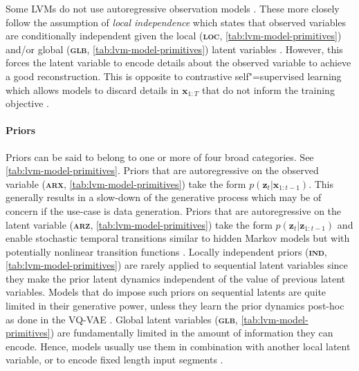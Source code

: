 {Some LVMs do not use autoregressive observation models \parencite{ebbers_hidden_2017, glarner_full_2018, hsu_unsupervised_2017, hsu_learning_2017, khurana_factorial_2019, khurana_convolutional_2020}. These more closely follow the assumption of \emph{local independence} which states that observed variables are conditionally independent given the local (\textbf{\textsc{loc}}, \cref{tab:lvm-model-primitives}) and/or global (\textbf{\textsc{glb}}, \cref{tab:lvm-model-primitives}) latent variables \parencite{bartholomew_latent_2011}. 
However, this forces the latent variable to encode details about the observed variable to achieve a good reconstruction. This is opposite to contrastive self"=supervised learning which allows models to discard details in $\mathbf{x}_{1:T}$ that do not inform the training objective \parencite{baevski_wav2vec_2020}.



\paragraph{Priors}
Priors can be said to belong to one or more of four broad categories. See \cref{tab:lvm-model-primitives}. 
Priors that are autoregressive on the observed variable (\textbf{\textsc{arx}}, \cref{tab:lvm-model-primitives}) take the form $p(\mathbf{z}_t|\mathbf{x}_{1:t-1})$. This generally results in a slow-down of the generative process which may be of concern if the use-case is data generation. 
Priors that are autoregressive on the latent variable (\textbf{\textsc{arz}}, \cref{tab:lvm-model-primitives}) take the form $p(\mathbf{z}_t|\mathbf{z}_{1:t-1})$ and enable stochastic temporal transitions similar to hidden Markov models but with potentially nonlinear transition functions \parencite{chung_recurrent_2015, fraccaro_sequential_2016, khurana_factorial_2019, khurana_convolutional_2020}.
Locally independent priors (\textbf{\textsc{ind}}, \cref{tab:lvm-model-primitives}) are rarely applied to sequential latent variables since they make the prior latent dynamics independent of the value of previous latent variables. Models that do impose such priors on sequential latents are quite limited in their generative power, unless they learn the prior dynamics post-hoc as done in the VQ-VAE \parencite{oord_neural_2018}. 
Global latent variables (\textbf{\textsc{glb}}, \cref{tab:lvm-model-primitives}) are fundamentally limited in the amount of information they can encode. Hence, models usually use them in combination with another local latent variable, or to encode fixed length input segments \parencite{khurana_factorial_2019, hsu_learning_2017, hsu_unsupervised_2017}.


}
